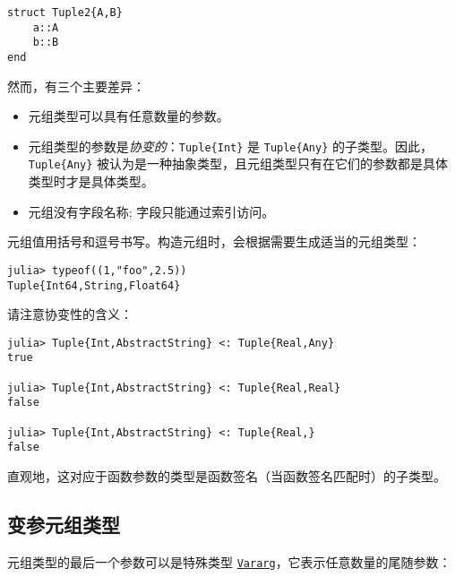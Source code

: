 \begin{verbatim}
struct Tuple2{A,B}
    a::A
    b::B
end
\end{verbatim}



然而，有三个主要差异：



\begin{itemize}
\item 元组类型可以具有任意数量的参数。


\item 元组类型的参数是\emph{协变的}：\texttt{Tuple\{Int\}} 是 \texttt{Tuple\{Any\}} 的子类型。因此，\texttt{Tuple\{Any\}} 被认为是一种抽象类型，且元组类型只有在它们的参数都是具体类型时才是具体类型。 


\item 元组没有字段名称; 字段只能通过索引访问。

\end{itemize}


元组值用括号和逗号书写。构造元组时，会根据需要生成适当的元组类型：




\begin{verbatim}
julia> typeof((1,"foo",2.5))
Tuple{Int64,String,Float64}
\end{verbatim}



请注意协变性的含义：




\begin{verbatim}
julia> Tuple{Int,AbstractString} <: Tuple{Real,Any}
true

julia> Tuple{Int,AbstractString} <: Tuple{Real,Real}
false

julia> Tuple{Int,AbstractString} <: Tuple{Real,}
false
\end{verbatim}



直观地，这对应于函数参数的类型是函数签名（当函数签名匹配时）的子类型。



\hypertarget{5746534767732668628}{}


\subsection{变参元组类型}



元组类型的最后一个参数可以是特殊类型 \hyperlink{5941806424098279588}{\texttt{Vararg}}，它表示任意数量的尾随参数：





